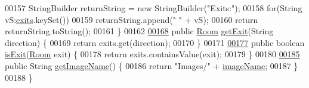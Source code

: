 \begin{DoxyCode}
00157         StringBuilder returnString = \textcolor{keyword}{new} StringBuilder(\textcolor{stringliteral}{"Exits:"});
00158         \textcolor{keywordflow}{for}(String vS:\hyperlink{classRoom_a29620da10d44de49ee8557e037f014af}{exits}.keySet())
00159             returnString.append(\textcolor{stringliteral}{" "} + vS);
00160         \textcolor{keywordflow}{return} returnString.toString();
00161     \}
00162 
\hypertarget{Room_8java_source_l00168}{}\hyperlink{classRoom_a384ab8c844e5775f87de24d6c470637e}{00168}     \textcolor{keyword}{public} \hyperlink{classRoom}{Room} \hyperlink{classRoom_a384ab8c844e5775f87de24d6c470637e}{getExit}(String direction) \{
00169         \textcolor{keywordflow}{return} exits.get(direction);
00170     \}
00171 
\hypertarget{Room_8java_source_l00177}{}\hyperlink{classRoom_a844b42638a0d2ce68df9adf1674f713b}{00177}     \textcolor{keyword}{public} \textcolor{keywordtype}{boolean} \hyperlink{classRoom_a844b42638a0d2ce68df9adf1674f713b}{isExit}(\hyperlink{classRoom}{Room} exit) \{
00178         \textcolor{keywordflow}{return} exits.containsValue(exit);
00179     \}
00180 
\hypertarget{Room_8java_source_l00185}{}\hyperlink{classRoom_a8177668df4d8be718812934673c42649}{00185}     \textcolor{keyword}{public} String \hyperlink{classRoom_a8177668df4d8be718812934673c42649}{getImageName}() \{
00186         \textcolor{keywordflow}{return} \textcolor{stringliteral}{"Images/"}  + \hyperlink{classRoom_a3ddf7c120b54509c43d803d2409158fc}{imageName};
00187     \}
00188 \}
\end{DoxyCode}
